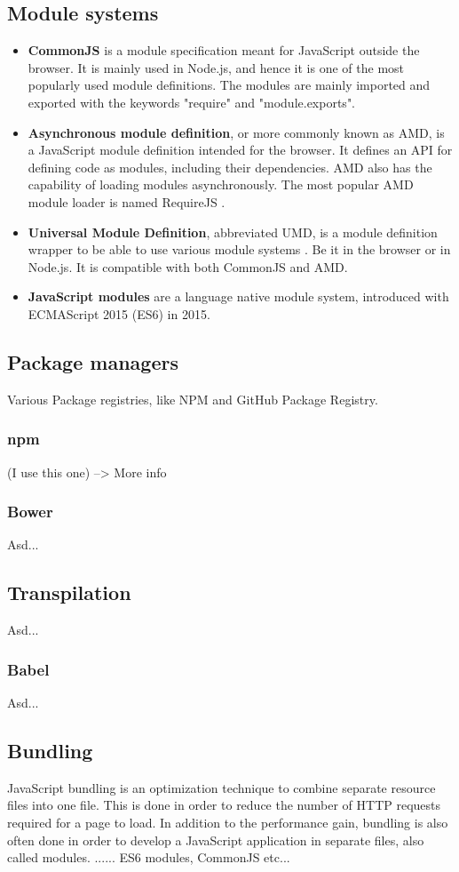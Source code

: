 \subsection{Module systems}
\begin{itemize}
    \item \textbf{CommonJS} is a module specification meant for JavaScript outside the browser. It is mainly used in Node.js, and hence it is one of the most popularly used module definitions. The modules are mainly imported and exported with the keywords "require" and "module.exports".
    \item \textbf{Asynchronous module definition}, or more commonly known as AMD, is a JavaScript module definition intended for the browser. It defines an API for defining code as modules, including their dependencies. AMD also has the capability of loading modules asynchronously. The most popular AMD module loader is named RequireJS \cite{requirejs}.
    \item \textbf{Universal Module Definition}, abbreviated UMD, is a module definition wrapper to be able to use various module systems \cite{universal-module-definition}. Be it in the browser or in Node.js. It is compatible with both CommonJS and AMD.
    \item \textbf{JavaScript modules} are a language native module system, introduced with ECMAScript 2015 (ES6) in 2015.
\end{itemize}

\subsection{Package managers}
Various Package registries, like NPM and GitHub Package Registry.
\subsubsection{npm}
(I use this one) --> More info
\subsubsection{Bower}
Asd...
\subsection{Transpilation}
Asd...
\subsubsection{Babel}
Asd...
\subsection{Bundling}
JavaScript bundling is an optimization technique to combine separate resource files into one file. This is done in order to reduce the number of HTTP requests required for a page to load. In addition to the performance gain, bundling is also often done in order to develop a JavaScript application in separate files, also called modules. ...... ES6 modules, CommonJS etc...

